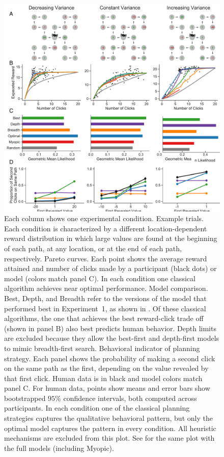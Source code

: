 \begin{figure}[p]
  \centering
  \includegraphics[width=\textwidth]{figs/planning/fig4.pdf}
  \caption{
    Each column shows one experimental condition.
     Example trials. Each condition is characterized by a different location-dependent reward distribution in which large values are found at the beginning of each path, at any location, or at the end of each path, respectively.
     Pareto curves. Each point shows the average reward attained and number of clicks made by a participant (black dots) or model (colors match panel C). In each condition one classical algorithm achieves near optimal performance.
     Model comparison. Best, Depth, and Breadth refer to the versions of the model that performed best in Experiment~1, as shown in . Of these classical algorithms, the one that achieves the best reward-click trade off (shown in panel B) also best predicts human behavior. Depth limits are excluded because they allow the best-first and depth-first models to mimic breadth-first search.
     Behavioral indicator of planning strategy. Each panel shows the probability of making a second click on the same path as the first, depending on the value revealed by that first click. Human data is in black and model colors match panel C. For human data, points show means and error bars show bootstrapped $95\%$ confidence intervals, both computed across participants. In each condition one of the classical planning strategies captures the qualitative behavioral pattern, but only the optimal model captures the pattern in every condition. All heuristic mechanisms are excluded from this plot. See  for the same plot with the full models (including Myopic).
  }
  \label{fig:planning-exp2}
\end{figure}




